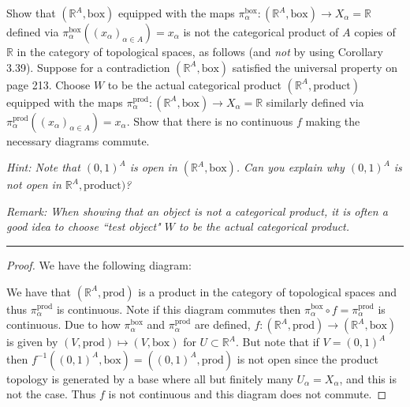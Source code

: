 \documentclass[leqno]{article}
\theoremstyle{nonumberplain}
\newtheorem{proof}{Proof}
\begin{document}
\noindent Show that $(\mathbb{R}^A,\textrm{box})$ equipped with the maps $\pi_\alpha^\textrm{box} \colon (\mathbb{R}^A,\textrm{box}) \to X_\alpha = \mathbb{R}$ defined via $\pi_\alpha^\textrm{box}((x_\alpha)_{\alpha \in A})=x_\alpha$ is not the categorical product of $A$ copies of $\mathbb{R}$ in the category of topological spaces, as follows (and \emph{not} by using Corollary 3.39). Suppose for a contradiction $(\mathbb{R}^A,\textrm{box})$ satisfied the universal property on page 213. Choose $W$ to be the actual categorical product $(\mathbb{R}^A,\textrm{product})$ equipped with the maps $\pi_\alpha^\textrm{prod} \colon (\mathbb{R}^A,\textrm{box}) \to X_\alpha = \mathbb{R}$ similarly defined via $\pi_\alpha^\textrm{prod}((x_\alpha)_{\alpha \in A})=x_\alpha$. Show that there is no continuous $f$ making the necessary diagrams commute. 

\noindent \emph{Hint: Note that $(0,1)^A$ is open in $(\mathbb{R}^A,\textrm{box})$. Can you explain why $(0,1)^A$ is not open in $\mathbb{R}^A,\textrm{product})$?}

\noindent \emph{Remark: When showing that an object is not a categorical product, it is often a good idea to choose ``test object" $W$ to be the actual categorical product.}

\noindent\rule[0.5ex]{\linewidth}{1pt}

\begin{proof}
We have the following diagram:

\centering
{}
\justify
We have that $(\mathbb{R}^A,\textrm{prod})$ is a product in the category of topological spaces and thus $\pi_\alpha^\textrm{prod}$ is continuous.  Note if this diagram commutes then $\pi_\alpha^\textrm{box} \circ f = \pi_\alpha^\textrm{prod}$ is continuous. Due to how $\pi_\alpha^\textrm{box}$ and $\pi_\alpha^\textrm{prod}$ are defined, $f\colon (\mathbb{R}^A,\textrm{prod}) \to (\mathbb{R}^A,\textrm{box})$ is given by $(V,\textrm{prod})\mapsto (V,\textrm{box})$ for $U \subset \mathbb{R}^A$.  But note that if $V=(0,1)^A$ then $f^{-1}((0,1)^A,\textrm{box})=((0,1)^A,\textrm{prod})$ is not open since the product topology is generated by a base where all but finitely many $U_\alpha = X_\alpha$, and this is not the case.  Thus $f$ is not continuous and this diagram does not commute.
\end{proof}


\pagebreak
\end{document}
